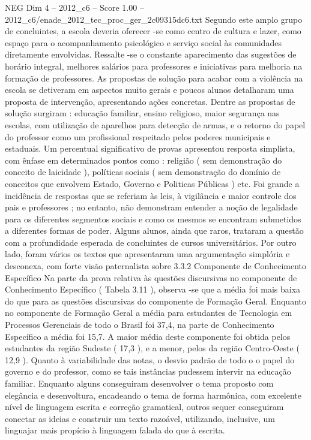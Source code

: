 \begin{textsample}{NEG Dim 4 – 2012\_c6 – Score 1.00 – 2012\_c6/enade\_2012\_tec\_proc\_ger\_2c09315dc6.txt}
Segundo este amplo grupo de concluintes, a escola deveria oferecer -se como centro de cultura e lazer, como espaço para o acompanhamento psicológico e serviço social às comunidades diretamente envolvidas.
Ressalte -se o constante aparecimento das sugestões de horário integral, melhores salários para professores e iniciativas para melhoria na formação de professores.
As propostas de solução para acabar com a violência na escola se detiveram em aspectos muito gerais e poucos alunos detalharam uma proposta de intervenção, apresentando ações concretas.
Dentre as propostas de solução surgiram : educação familiar, ensino religioso, maior segurança nas escolas, com utilização de aparelhos para detecção de armas, e o retorno do papel do professor como um profissional respeitado pelos poderes municipais e estaduais.
Um percentual significativo de provas apresentou resposta simplista, com ênfase em determinados pontos como : religião ( sem demonstração do conceito de laicidade ), políticas sociais ( sem demonstração do domínio de conceitos que envolvem Estado, Governo e Politicas Públicas ) etc.
Foi grande a incidência de respostas que se referiam às leis, à vigilância e maior controle dos pais e professores ; no entanto, não demonstram entender a noção de legalidade para os diferentes segmentos sociais e como os mesmos se encontram submetidos a diferentes formas de poder.
Alguns alunos, ainda que raros, trataram a questão com a profundidade esperada de concluintes de cursos universitários.
Por outro lado, foram vários os textos que apresentaram uma argumentação simplória e desconexa, com forte visão paternalista sobre 3.3.2 Componente de Conhecimento Específico Na parte da prova relativa às questões discursivas no componente de Conhecimento Específico ( Tabela 3.11 ), observa -se que a média foi mais baixa do que para as questões discursivas do componente de Formação Geral.
Enquanto no componente de Formação Geral a média para estudantes de Tecnologia em Processos Gerenciais de todo o Brasil foi 37,4, na parte de Conhecimento Específico a média foi 15,7.
A maior média deste componente foi obtida pelos estudantes da região Sudeste ( 17,3 ), e a menor, pelos da região Centro-Oeste ( 12,9 ).
Quanto à variabilidade das notas, o desvio padrão de todo o o papel do governo e do professor, como se tais instâncias pudessem intervir na educação familiar.
Enquanto alguns conseguiram desenvolver o tema proposto com elegância e desenvoltura, encadeando o tema de forma harmônica, com excelente nível de linguagem escrita e correção gramatical, outros sequer conseguiram conectar as ideias e construir um texto razoável, utilizando, inclusive, um linguajar mais propício à linguagem falada do que à escrita.

\end{textsample}

